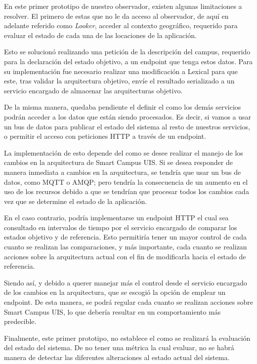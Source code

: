 En este primer prototipo de nuestro observador, existen algunas limitaciones a resolver. El primero de estas que no le da acceso al observador, de aquí en adelante referido como \textit{Looker}, acceder al contexto geográfico, requerido para evaluar el estado de cada una de las locaciones de la aplicación. 

Esto se solucionó realizando una petición de la descripción del campus, requerido para la declaración del estado objetivo, a un endpoint que tenga estos datos. Para su implementación fue necesario realizar una modificación a Lexical para que este, tras validar la arquitectura objetivo, envíe el resultado serializado a un servicio encargado de almacenar las arquitecturas objetivo. 

De la misma manera, quedaba pendiente el definir el como los demás servicios podrán acceder a los datos que están siendo procesados. Es decir, si vamos a usar un bus de datos para publicar el estado del sistema al resto de nuestros servicios, o permitir el acceso con peticiones HTTP a través de un endpoint.

La implementación de esto depende del como se desee realizar el manejo de los cambios en la arquitectura de Smart Campus UIS. Si se desea responder de manera inmediata a cambios en la arquitectura, se tendría que usar un bus de datos, como MQTT o AMQP; pero tendría la consecuencia de un aumento en el uso de los recursos debido a que se tendrían que procesar todos los cambios cada vez que se determine el estado de la aplicación. 

En el caso contrario, podría implementarse un endpoint HTTP el cual sea consultado en intervalos de tiempo por el servicio encargado de comparar los estados objetivo y de referencia. Esto permitiría tener un mayor control de cada cuanto se realizan las comparaciones, y más importante, cada cuanto se realizan acciones sobre la arquitectura actual con el fin de modificarla hacia el estado de referencia.

Siendo así, y debido a querer manejar más el control desde el servicio encargado de los cambios en la arquitectura, que se escogió la opción de emplear un endpoint. De esta manera, se podrá regular cada cuanto se realizan acciones sobre Smart Campus UIS, lo que debería resultar en un comportamiento más predecible.

Finalmente, este primer prototipo, no establece el como se realizará la evaluación del estado del sistema. De no tener una métrica la cual evaluar, no se habrá manera de detectar las diferentes alteraciones al estado actual del sistema.

